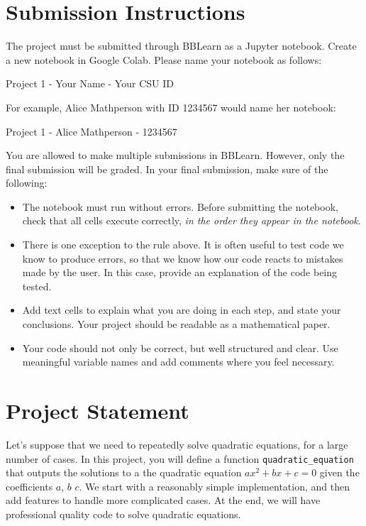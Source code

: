 \documentclass[12pt]{article}
\begin{document}
\sffamily

\section{Submission Instructions}
The project must be submitted through BBLearn as a Jupyter notebook. Create a new notebook in Google Colab. Please name your notebook as follows:

\begin{center}
Project 1 - Your Name - Your CSU ID
\end{center}

For example, Alice Mathperson with ID 1234567 would name her notebook:

\begin{center}
Project 1 - Alice Mathperson - 1234567
\end{center}

You are allowed to make multiple submissions in BBLearn. However, only the final submission will be graded. In your final submission, make sure of the following:

\begin{itemize}
\item The notebook must run without errors. Before submitting the notebook, check that all cells execute correctly, \emph{in the order they appear in the notebook}.
\item There is one exception to the rule above. It is often useful to test code we know to produce errors, so that we know how our code reacts to mistakes made by the user. In this case, provide an explanation of the code being tested.
\item Add text cells to explain what you are doing in each step, and state your conclusions. Your project should be readable as a mathematical paper.
\item Your code should not only be correct, but well structured and clear. Use meaningful variable names and add comments where you feel necessary.
\end{itemize}

\section{Project Statement}
Let's suppose that we need to repeatedly solve quadratic equations, for a large number of cases. In this project, you will define a function \texttt{quadratic\_equation} that outputs the solutions to a the quadratic equation $ax^2+bx+c=0$ given the coefficients $a$, $b$ $c$. We start with a reasonably simple implementation, and then add features to handle more complicated cases. At the end, we will have professional quality code to solve quadratic equations.
\end{document}
